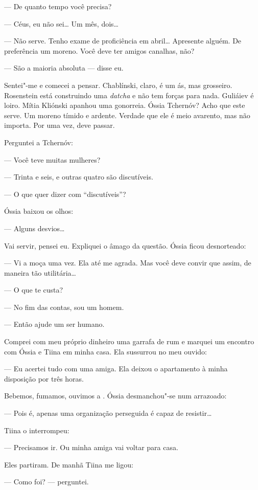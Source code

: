 --- De quanto tempo você precisa?

--- Céus, eu não sei\ldots{} Um mês, dois\ldots{}

--- Não serve. Tenho exame de proficiência em abril\ldots{} Apresente alguém.
De preferência um moreno. Você deve ter amigos canalhas, não?

--- São a maioria absoluta --- disse eu.

Sentei"-me e comecei a pensar. Chablínski, claro, é um ás, mas grosseiro.
Rosenstein está construindo uma \emph{datcha} e não tem forças para
nada. Guliáiev é loiro. Mítia Kliónski apanhou uma gonorreia. Óssia
Tchernóv? Acho que este serve. Um moreno tímido e ardente. Verdade que
ele é meio avarento, mas não importa. Por uma vez, deve passar.

Perguntei a Tchernóv:

--- Você teve muitas mulheres?

--- Trinta e seis, e outras quatro são discutíveis.

--- O que quer dizer com ``discutíveis''?

Óssia baixou os olhos:

--- Alguns desvios\ldots{}

Vai servir, pensei eu. Expliquei o âmago da questão. Óssia ficou
desnorteado:

--- Vi a moça uma vez. Ela até me agrada. Mas você deve convir que
assim, de maneira tão utilitária\ldots{}

--- O que te custa?

--- No fim das contas, sou um homem.

--- Então ajude um ser humano.

Comprei com meu próprio dinheiro uma garrafa de rum e marquei um
encontro com Óssia e Tiina em minha casa. Ela sussurrou no meu ouvido:

--- Eu acertei tudo com uma amiga. Ela deixou o apartamento à minha
disposição por três horas.

Bebemos, fumamos, ouvimos a \emph{}. Óssia desmanchou"-se num
arrazoado:

--- Pois é, apenas uma organização perseguida é capaz de resistir\ldots{}

Tiina o interrompeu:

--- Precisamos ir. Ou minha amiga vai voltar para casa.

Eles partiram. De manhã Tiina me ligou:

--- Como foi? --- perguntei.

